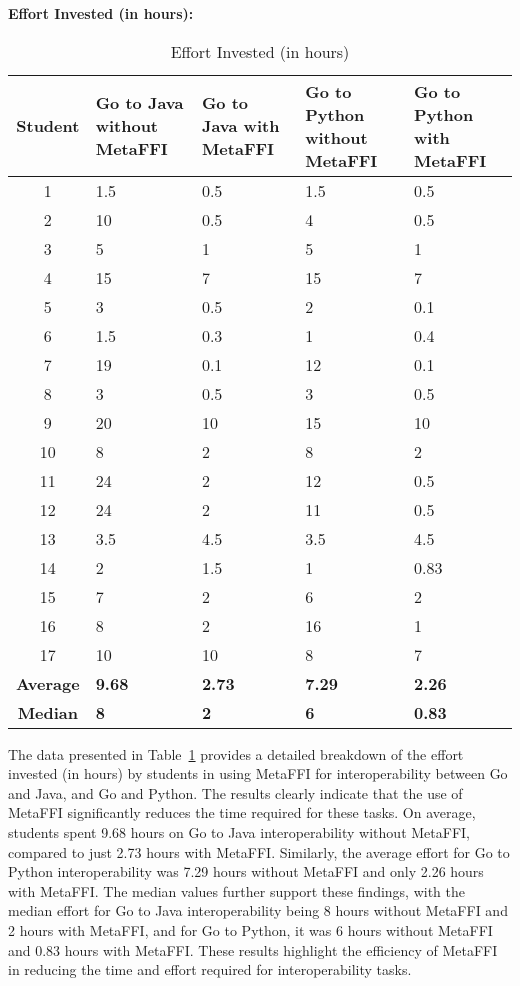 \documentclass[sigplan,10pt,manuscript,nonacm]{acmart}
\begin{document}
\textbf{Effort Invested (in hours):}
\begin{table}[h!]
\centering
\begin{tabular}{|c|p{3cm}|p{3cm}|p{3cm}|p{3cm}|}
\hline
\textbf{Student} & \textbf{Go to Java without MetaFFI} & \textbf{Go to Java with MetaFFI} & \textbf{Go to Python without MetaFFI} & \textbf{Go to Python with MetaFFI} \\ \hline
1 & 1.5 & 0.5 & 1.5 & 0.5 \\ \hline
2 & 10 & 0.5 & 4 & 0.5 \\ \hline
3 & 5 & 1 & 5 & 1 \\ \hline
4 & 15 & 7 & 15 & 7 \\ \hline
5 & 3 & 0.5 & 2 & 0.1 \\ \hline
6 & 1.5 & 0.3 & 1 & 0.4 \\ \hline
7 & 19 & 0.1 & 12 & 0.1 \\ \hline
8 & 3 & 0.5 & 3 & 0.5 \\ \hline
9 & 20 & 10 & 15 & 10 \\ \hline
10 & 8 & 2 & 8 & 2 \\ \hline
11 & 24 & 2 & 12 & 0.5 \\ \hline
12 & 24 & 2 & 11 & 0.5 \\ \hline
13 & 3.5 & 4.5 & 3.5 & 4.5 \\ \hline
14 & 2 & 1.5 & 1 & 0.83 \\ \hline
15 & 7 & 2 & 6 & 2 \\ \hline
16 & 8 & 2 & 16 & 1 \\ \hline
17 & 10 & 10 & 8 & 7 \\ \hline
\textbf{Average} & \textbf{9.68} & \textbf{2.73} & \textbf{7.29} & \textbf{2.26} \\ \hline
\textbf{Median} & \textbf{8} & \textbf{2} & \textbf{6} & \textbf{0.83} \\ \hline
\end{tabular}
\caption{Effort Invested (in hours)}
\label{tab:effort}
\end{table}

The data presented in Table~\ref{tab:effort} provides a detailed breakdown of the effort invested (in hours) by students in using MetaFFI for interoperability between Go and Java, and Go and Python. The results clearly indicate that the use of MetaFFI significantly reduces the time required for these tasks. On average, students spent 9.68 hours on Go to Java interoperability without MetaFFI, compared to just 2.73 hours with MetaFFI. Similarly, the average effort for Go to Python interoperability was 7.29 hours without MetaFFI and only 2.26 hours with MetaFFI. The median values further support these findings, with the median effort for Go to Java interoperability being 8 hours without MetaFFI and 2 hours with MetaFFI, and for Go to Python, it was 6 hours without MetaFFI and 0.83 hours with MetaFFI. These results highlight the efficiency of MetaFFI in reducing the time and effort required for interoperability tasks.
\end{document}
